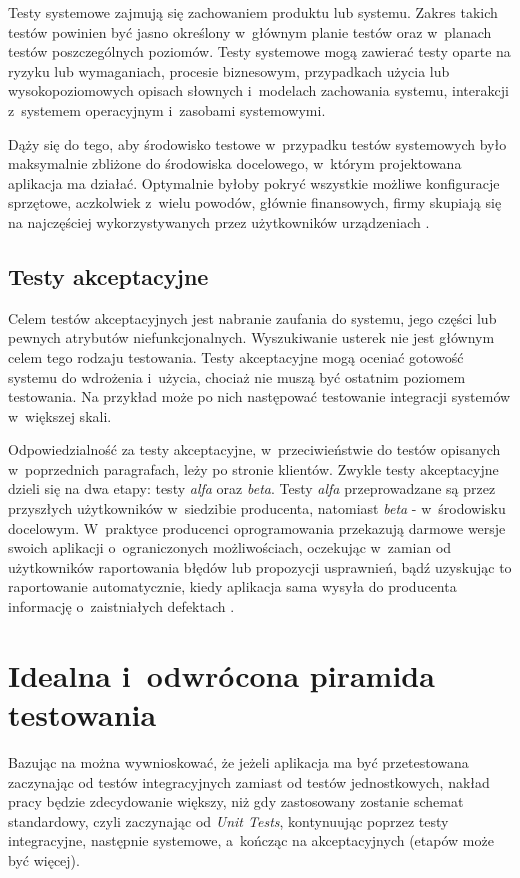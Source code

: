 Testy systemowe zajmują się zachowaniem produktu lub systemu. Zakres takich testów powinien być jasno określony w~głównym planie testów oraz w~planach testów poszczególnych poziomów. Testy systemowe mogą zawierać testy oparte na ryzyku lub wymaganiach, procesie biznesowym, przypadkach użycia lub wysokopoziomowych opisach słownych i~modelach zachowania systemu, interakcji z~systemem operacyjnym i~zasobami systemowymi.

Dąży się do tego, aby środowisko testowe w~przypadku testów systemowych było maksymalnie zbliżone do środowiska docelowego, w~którym projektowana aplikacja ma działać. Optymalnie byłoby pokryć wszystkie możliwe konfiguracje sprzętowe, aczkolwiek z~wielu powodów, głównie finansowych, firmy skupiają się na najczęściej wykorzystywanych przez użytkowników urządzeniach \cite{bib:sylabus:foundation}. 

\subsection{Testy akceptacyjne}

Celem testów akceptacyjnych jest nabranie zaufania do systemu, jego części lub pewnych atrybutów niefunkcjonalnych. Wyszukiwanie usterek nie jest głównym celem tego rodzaju testowania. Testy akceptacyjne mogą oceniać gotowość systemu do wdrożenia i~użycia, chociaż nie muszą być ostatnim poziomem testowania. Na przykład może po nich następować testowanie integracji systemów w~większej skali.

Odpowiedzialność za testy akceptacyjne, w~przeciwieństwie do testów opisanych w~poprzednich paragrafach, leży po stronie klientów. Zwykle testy akceptacyjne dzieli się na dwa etapy: testy \textit{alfa} oraz \textit{beta}. Testy \textit{alfa} przeprowadzane są przez przyszłych użytkowników w~siedzibie producenta, natomiast \textit{beta} - w~środowisku docelowym. W~praktyce producenci oprogramowania przekazują darmowe wersje swoich aplikacji o~ograniczonych możliwościach, oczekując w~zamian od użytkowników raportowania błędów lub propozycji usprawnień, bądź uzyskując to raportowanie automatycznie, kiedy aplikacja sama wysyła do producenta informację o~zaistniałych defektach \cite{bib:sylabus:foundation}.

\section{Idealna i~odwrócona piramida testowania}
\label{piramida_testowania}
Bazując na \cite{bib:android:testing:learning} można wywnioskować, że jeżeli aplikacja ma być przetestowana zaczynając od testów integracyjnych zamiast od testów jednostkowych, nakład pracy będzie zdecydowanie większy, niż gdy zastosowany zostanie schemat standardowy, czyli zaczynając od \textit{Unit Tests}, kontynuując poprzez testy integracyjne, następnie systemowe, a~kończąc na akceptacyjnych (etapów może być więcej). 

